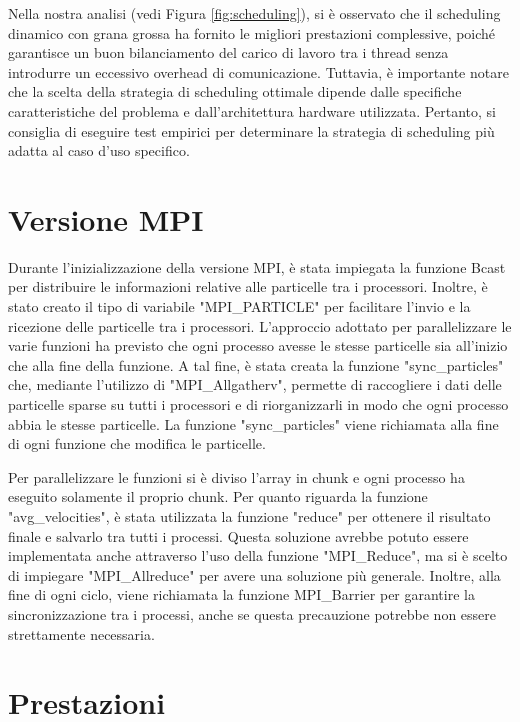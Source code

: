 \documentclass[a4paper,12pt, oneside]{article}
\begin{document}
Nella nostra analisi (vedi Figura \ref{fig:scheduling}), si è osservato che il scheduling dinamico con grana grossa ha fornito le
migliori prestazioni complessive, poiché garantisce un buon bilanciamento del carico di lavoro tra
i thread senza introdurre un eccessivo overhead di comunicazione. Tuttavia, è importante notare che
la scelta della strategia di scheduling ottimale dipende dalle specifiche caratteristiche del
problema e dall'architettura hardware utilizzata. Pertanto, si consiglia di eseguire test
empirici per determinare la strategia di scheduling più adatta al caso d'uso specifico.

\section{Versione MPI}

Durante l'inizializzazione della versione MPI, è stata impiegata la funzione Bcast per
distribuire le informazioni relative alle particelle tra i processori. Inoltre, è stato
creato il tipo di variabile "MPI\_PARTICLE" per facilitare l'invio e la ricezione delle
particelle tra i processori.
L'approccio adottato per parallelizzare le varie funzioni ha previsto che ogni processo
avesse le stesse particelle sia all'inizio che alla fine della funzione. A tal fine, è
stata creata la funzione "sync\_particles" che, mediante l'utilizzo di "MPI\_Allgatherv",
permette di raccogliere i dati delle particelle sparse su tutti i processori e di
riorganizzarli in modo che ogni processo abbia le stesse particelle. La funzione
"sync\_particles" viene richiamata alla fine di ogni funzione che modifica le particelle.

Per parallelizzare le funzioni si è diviso l'array in chunk e ogni processo ha eseguito
solamente il proprio chunk. Per quanto riguarda la funzione "avg\_velocities", è stata
utilizzata la funzione "reduce" per ottenere il risultato finale e salvarlo tra tutti i
processi. Questa soluzione avrebbe potuto essere implementata anche attraverso l'uso
della funzione "MPI\_Reduce", ma si è scelto di impiegare "MPI\_Allreduce" per avere 
una soluzione più generale.
Inoltre, alla fine di ogni ciclo, viene richiamata la funzione MPI\_Barrier per garantire
la sincronizzazione tra i processi, anche se questa precauzione potrebbe non essere
strettamente necessaria.

\section{Prestazioni}
\end{document}
